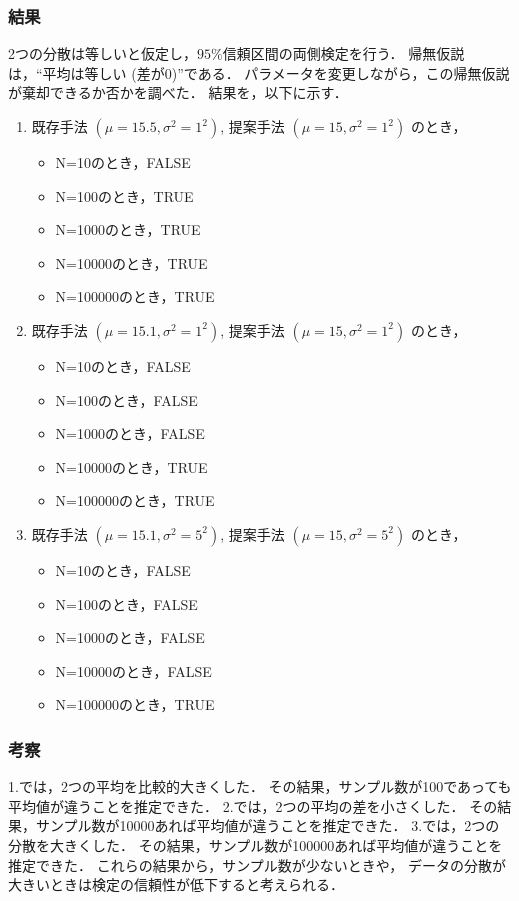\documentclass{jsarticle}
\begin{document}
\subsubsection*{結果}
2つの分散は等しいと仮定し，$95\%$信頼区間の両側検定を行う．
帰無仮説は，``平均は等しい (差が0)''である．
パラメータを変更しながら，この帰無仮説が棄却できるか否かを調べた．
結果を，以下に示す．

\begin{enumerate}
	\item
		既存手法 $(\mu=15.5, \sigma^2=1^2)$,
		提案手法 $(\mu=15, \sigma^2=1^2)$ のとき，
		\begin{itemize}
			\item N=10のとき，FALSE
			\item N=100のとき，TRUE
			\item N=1000のとき，TRUE
			\item N=10000のとき，TRUE
			\item N=100000のとき，TRUE
		\end{itemize}
	\item
		既存手法 $(\mu=15.1, \sigma^2=1^2)$,
		提案手法 $(\mu=15, \sigma^2=1^2)$ のとき，
		\begin{itemize}
			\item N=10のとき，FALSE
			\item N=100のとき，FALSE
			\item N=1000のとき，FALSE
			\item N=10000のとき，TRUE
			\item N=100000のとき，TRUE
		\end{itemize}
	\item
		既存手法 $(\mu=15.1, \sigma^2=5^2)$,
		提案手法 $(\mu=15, \sigma^2=5^2)$ のとき，
		\begin{itemize}
			\item N=10のとき，FALSE
			\item N=100のとき，FALSE
			\item N=1000のとき，FALSE
			\item N=10000のとき，FALSE
			\item N=100000のとき，TRUE
		\end{itemize}
\end{enumerate}

\subsubsection*{考察}
1.では，2つの平均を比較的大きくした．
その結果，サンプル数が100であっても平均値が違うことを推定できた．
2.では，2つの平均の差を小さくした．
その結果，サンプル数が10000あれば平均値が違うことを推定できた．
3.では，2つの分散を大きくした．
その結果，サンプル数が100000あれば平均値が違うことを推定できた．
これらの結果から，サンプル数が少ないときや，
データの分散が大きいときは検定の信頼性が低下すると考えられる．
\end{document}
